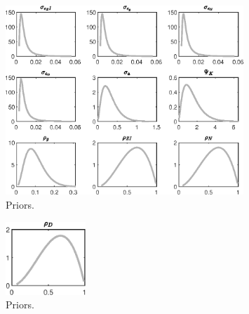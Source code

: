  
\begin{figure}[H]
\centering
\includegraphics[width=0.80\textwidth]{BRS_growth_ext_fd/graphs/BRS_growth_ext_fd_Priors1}
\caption{Priors.}\label{Fig:Priors:1}
\end{figure}
\begin{figure}[H]
\centering
\includegraphics[width=0.27\textwidth]{BRS_growth_ext_fd/graphs/BRS_growth_ext_fd_Priors2}
\caption{Priors.}\label{Fig:Priors:2}
\end{figure}
 
